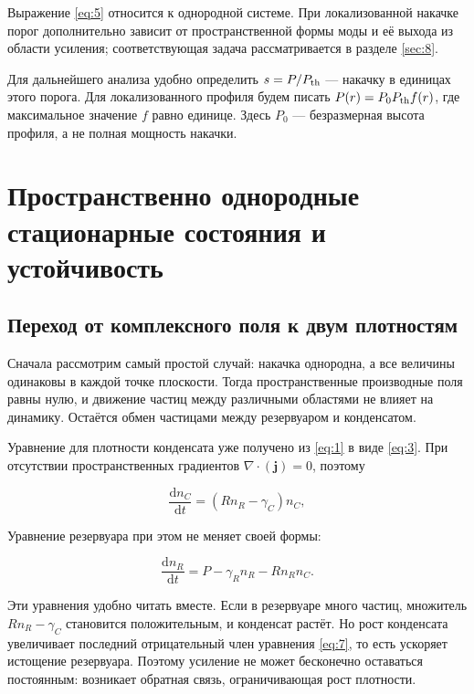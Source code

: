 \documentclass[12pt,a4paper]{article}
\begin{document}
Выражение \eqref{eq:5} относится к однородной системе. При локализованной накачке порог дополнительно зависит от пространственной формы моды и её выхода из области усиления; соответствующая задача рассматривается в разделе \ref{sec:8}.

Для дальнейшего анализа удобно определить $s=P/P_{\rm th}$ --- накачку в единицах этого порога. Для локализованного профиля будем писать $P(r)=P_{0} P_{\rm th} f(r)$, где максимальное значение $f$ равно единице. Здесь $P_{0}$ --- безразмерная высота профиля, а не полная мощность накачки.

\clearpage

\section{Пространственно однородные стационарные состояния и устойчивость}\label{sec:3}

\subsection{Переход от комплексного поля к двум плотностям}\label{sec:3.1}

Сначала рассмотрим самый простой случай: накачка однородна, а все величины одинаковы в каждой точке плоскости. Тогда пространственные производные поля равны нулю, и движение частиц между различными областями не влияет на динамику. Остаётся обмен частицами между резервуаром и конденсатом.

Уравнение для плотности конденсата уже получено из \eqref{eq:1} в виде \eqref{eq:3}. При отсутствии пространственных градиентов $\nabla\cdot(\mathbf j)=0$, поэтому

\begin{equation}\label{eq:6}
\frac{\mathrm dn_C}{\mathrm dt}=(Rn_R-\gamma_C)n_C,\end{equation}

Уравнение резервуара при этом не меняет своей формы:

\begin{equation}\label{eq:7}
\frac{\mathrm dn_R}{\mathrm dt}=P-\gamma_R n_R-Rn_Rn_C.\end{equation}

Эти уравнения удобно читать вместе. Если в резервуаре много частиц, множитель $R n_{R}-\gamma_{C}$ становится положительным, и конденсат растёт. Но рост конденсата увеличивает последний отрицательный член уравнения \eqref{eq:7}, то есть ускоряет истощение резервуара. Поэтому усиление не может бесконечно оставаться постоянным: возникает обратная связь, ограничивающая рост плотности.
\end{document}

